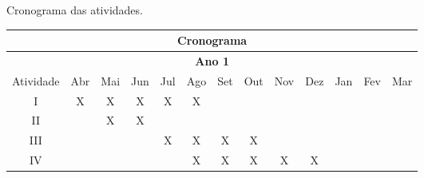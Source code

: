 
\begin{quadro}[ht]
\caption{Cronograma das atividades.\label{qua:cronograma}}
\begin{tabular}{|ccccccccccccc|}
\hline
\multicolumn{13}{|c|}{\textbf{Cronograma}}                    \\ \hline
\multicolumn{13}{|c|}{\textbf{Ano 1}}
\\ \hline
\multicolumn{1}{|c|}{Atividade} & \multicolumn{1}{c|}{Abr} & \multicolumn{1}{c|}{Mai} & \multicolumn{1}{c|}{Jun} & \multicolumn{1}{c|}{Jul} & \multicolumn{1}{c|}{Ago} & \multicolumn{1}{c|}{Set} & \multicolumn{1}{c|}{Out} & \multicolumn{1}{c|}{Nov} & \multicolumn{1}{c|}{Dez} & \multicolumn{1}{c|}{Jan} & \multicolumn{1}{c|}{Fev} & \multicolumn{1}{c|}{Mar} \\ 
\hline
\multicolumn{1}{|c|}{I}         & \multicolumn{1}{c|}{X}    & \multicolumn{1}{c|}{X}    & \multicolumn{1}{c|}{X}    & \multicolumn{1}{c|}{X}    & \multicolumn{1}{c|}{X}    & \multicolumn{1}{c|}{}    & \multicolumn{1}{c|}{}    & \multicolumn{1}{c|}{}    & \multicolumn{1}{c|}{}    & \multicolumn{1}{c|}{}    & \multicolumn{1}{c|}{}    &   \multicolumn{1}{c|}{}  \\ 
\hline
\multicolumn{1}{|c|}{II}        & \multicolumn{1}{c|}{}    & \multicolumn{1}{c|}{X}    & \multicolumn{1}{c|}{X}    & \multicolumn{1}{c|}{}    & \multicolumn{1}{c|}{}    & \multicolumn{1}{c|}{}    & \multicolumn{1}{c|}{}    & \multicolumn{1}{c|}{}    & \multicolumn{1}{c|}{}    & \multicolumn{1}{c|}{}    & \multicolumn{1}{c|}{}    &   \multicolumn{1}{c|}{}  \\ 
\hline
\multicolumn{1}{|c|}{III}       & \multicolumn{1}{c|}{}    & \multicolumn{1}{c|}{}    & \multicolumn{1}{c|}{}    & \multicolumn{1}{c|}{X}    & \multicolumn{1}{c|}{X}    & \multicolumn{1}{c|}{X}    & \multicolumn{1}{c|}{X}    & \multicolumn{1}{c|}{}    & \multicolumn{1}{c|}{}    & \multicolumn{1}{c|}{}    & \multicolumn{1}{c|}{}    &   \multicolumn{1}{c|}{}  \\ \hline
\multicolumn{1}{|c|}{IV}        & \multicolumn{1}{c|}{}    & \multicolumn{1}{c|}{}    & \multicolumn{1}{c|}{}    & \multicolumn{1}{c|}{}    & \multicolumn{1}{c|}{X}    & \multicolumn{1}{c|}{X}    & \multicolumn{1}{c|}{X}    & \multicolumn{1}{c|}{X}    & \multicolumn{1}{c|}{X}    & \multicolumn{1}{c|}{}    & \multicolumn{1}{c|}{}    &  \multicolumn{1}{c|}{}   \\

\end{tabular}
\end{quadro}

